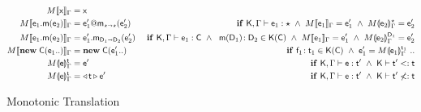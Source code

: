 \documentclass[sigconf]{acmart}
\begin{document}
\begin{figure*}[!t]
\center

\begin{center}
\begin{minipage}{10cm}
\begin{align*}
\TRG[M]{\x}\Env &= \x & \\
\TRG[M]{\Call{\e_1}\m{{\e_2}}}\Env &= \DynCall{\ep_1}\m{\ep_2} & 
   \IF\EM{\TypeCk{\K,\Env}{\e[1]}\any ~ \AND ~
    \TRG[M]{\e_1}\Env = \ep_1}
   \EM{~\AND~ \TAG[M]{\e_2}\Env{\any} = \ep_2}\\
\TRG[M]{\Call{\e_1}\m{{\e_2}}}\Env &= \KCall{\ep_1}\m{\ep_2}{\D[1]}{\D[2]} & 
    \IF\EM{\TypeCk{\K,\Env}{\e[1]}\C ~ \AND\; ~ 
    \Mtype\m{\D[1]}{\D[2]}\In\App\K\C}
  ~\EM{\AND ~ \TRG[M]{\e_1}\Env= \ep_1 
   ~\AND~ \TAG[M]{\e_2}\Env{\D[1]} = \ep_2}\\
\TRG[M]{\New\C{{\e_1}..}}\Env &= \New\C{\ep_1..} & 
   \IF\EM{\Ftype{\f[1]}{\t[1]}\In\App\K\C ~\AND~
     \ep[1] = \TAG[M]{\e[1]}\Env{\t[1]} ~..}\\
\TAG[M]{\e}{\Env}\t &= \e' & \IF\EM{\TypeCk{\K,\Env}\e\tp 
     ~\AND~ \K\vdash\tp\Sub\t}\\
\TAG[M]{\e}{\Env}\t &= \MonCast{\t}{\ep} & \IF\EM{\TypeCk{\K,\Env}\e\tp 
    ~\AND~ \K\vdash\tp\not\Sub\t}
\end{align*}
\end{minipage}
\end{center}
\caption{Monotonic Translation}
\end{figure*}
\end{document}
